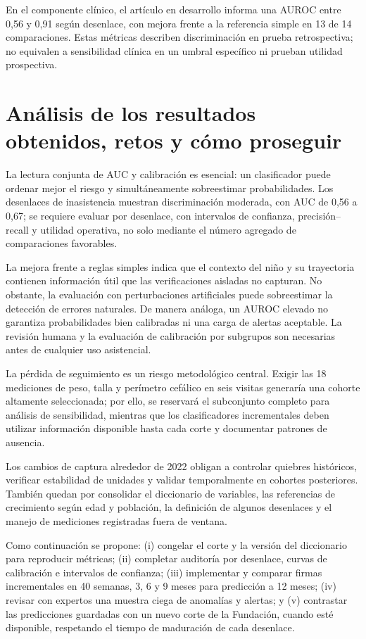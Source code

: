 \documentclass[conference,letterpaper]{IEEEtran}
\begin{document}
En el componente clínico, el artículo en desarrollo informa una AUROC entre 0,56 y 0,91 según desenlace, con mejora frente a la referencia simple en 13 de 14 comparaciones. Estas métricas describen discriminación en prueba retrospectiva; no equivalen a sensibilidad clínica en un umbral específico ni prueban utilidad prospectiva.

\section{Análisis de los resultados obtenidos, retos y cómo proseguir}

La lectura conjunta de AUC y calibración es esencial: un clasificador puede ordenar mejor el riesgo y simultáneamente sobreestimar probabilidades. Los desenlaces de inasistencia muestran discriminación moderada, con AUC de 0,56 a 0,67; se requiere evaluar por desenlace, con intervalos de confianza, precisión--recall y utilidad operativa, no solo mediante el número agregado de comparaciones favorables.

La mejora frente a reglas simples indica que el contexto del niño y su trayectoria contienen información útil que las verificaciones aisladas no capturan. No obstante, la evaluación con perturbaciones artificiales puede sobreestimar la detección de errores naturales. De manera análoga, un AUROC elevado no garantiza probabilidades bien calibradas ni una carga de alertas aceptable. La revisión humana y la evaluación de calibración por subgrupos son necesarias antes de cualquier uso asistencial.

La pérdida de seguimiento es un riesgo metodológico central. Exigir las 18 mediciones de peso, talla y perímetro cefálico en seis visitas generaría una cohorte altamente seleccionada; por ello, se reservará el subconjunto completo para análisis de sensibilidad, mientras que los clasificadores incrementales deben utilizar información disponible hasta cada corte y documentar patrones de ausencia.

Los cambios de captura alrededor de 2022 obligan a controlar quiebres históricos, verificar estabilidad de unidades y validar temporalmente en cohortes posteriores. También quedan por consolidar el diccionario de variables, las referencias de crecimiento según edad y población, la definición de algunos desenlaces y el manejo de mediciones registradas fuera de ventana.

Como continuación se propone: (i) congelar el corte y la versión del diccionario para reproducir métricas; (ii) completar auditoría por desenlace, curvas de calibración e intervalos de confianza; (iii) implementar y comparar firmas incrementales en 40 semanas, 3, 6 y 9 meses para predicción a 12 meses; (iv) revisar con expertos una muestra ciega de anomalías y alertas; y (v) contrastar las predicciones guardadas con un nuevo corte de la Fundación, cuando esté disponible, respetando el tiempo de maduración de cada desenlace.
\end{document}
